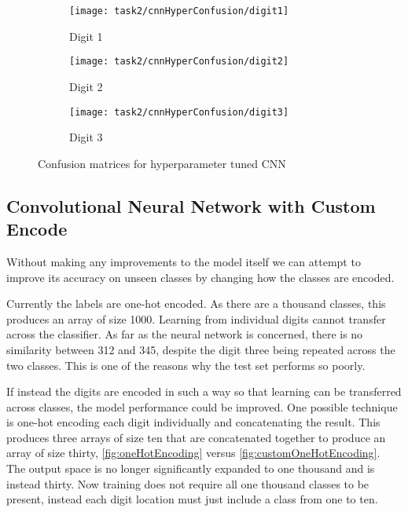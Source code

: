 \begin{figure}[!htbp]
    \centering
    \begin{subfigure}{0.3\textwidth}
        \texttt{[image: task2/cnnHyperConfusion/digit1]}
        \caption{Digit 1}
        \label{fig:cnnHyperConfusionMatrix1}
    \end{subfigure}
    \begin{subfigure}{0.3\textwidth}
        \texttt{[image: task2/cnnHyperConfusion/digit2]}
        \caption{Digit 2}
        \label{fig:cnnHyperConfusionMatrix2}
    \end{subfigure}
    \begin{subfigure}{0.3\textwidth}
        \texttt{[image: task2/cnnHyperConfusion/digit3]}
        \caption{Digit 3}
        \label{fig:cnnHyperConfusionMatrix3}
    \end{subfigure}
    \caption{Confusion matrices for hyperparameter tuned CNN}
    \label{fig:cnnHyperConfusionMatrix}
\end{figure}

\pagebreak
\subsection{Convolutional Neural Network with Custom Encode}
Without making any improvements to the model itself we can attempt to improve its accuracy on unseen classes by changing how the classes are encoded.

Currently the labels are one-hot encoded. As there are a thousand classes, this produces an array of size 1000. Learning from individual digits cannot transfer across the classifier. As far as the neural network is concerned, there is no similarity between 312 and 345, despite the digit three being repeated across the two classes. This is one of the reasons why the test set performs so poorly.

If instead the digits are encoded in such a way so that learning can be transferred across classes, the model performance could be improved. One possible technique is one-hot encoding each digit individually and concatenating the result. This produces three arrays of size ten that are concatenated together to produce an array of size thirty, \autoref{fig:oneHotEncoding} versus \autoref{fig:customOneHotEncoding}. The output space is no longer significantly expanded to one thousand and is instead thirty. Now training does not require all one thousand classes to be present, instead each digit location must just include a class from one to ten.

